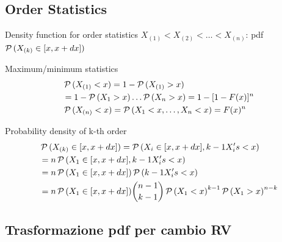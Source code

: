 \documentclass[asd-beamer.tex]{subfiles}%
\begin{document}
\subsection{Order Statistics}

\begin{frame}{Density function for order statistics}
	$X_{(1)}<X_{(2)}<\ldots<X_{(n)}$: pdf $\operatorname{\mathcal{P}}{(X_{(k)}\in[x,x+dx])}$
	\begin{block}{Maximum/minimum statistics}
		\begin{align*}
		&\operatorname{\mathcal{P}}{(X_{(1)}<x)}=1-\operatorname{\mathcal{P}}{(X_{(1)}>x)}\\
		&=1-\operatorname{\mathcal{P}}{(X_1>x)}\ldots\operatorname{\mathcal{P}}{(X_n>x)}=1-[1-F(x)]^n\\
		&\operatorname{\mathcal{P}}{(X_{(n)}<x)}=\operatorname{\mathcal{P}}{(X_1<x,\ldots,X_n<x)}=F(x)^n
		\end{align*}
	\end{block}
	\begin{block}{Probability density of k-th order}
		\begin{align*}
		&\operatorname{\mathcal{P}}{(X_{(k)}\in[x,x+dx])}=\operatorname{\mathcal{P}}{(X_i\in[x,x+dx],k-1 X_i's<x)}\\
		&=n\operatorname{\mathcal{P}}{(X_1\in[x,x+dx],k-1 X_i's<x)}\\
		&=n\operatorname{\mathcal{P}}{(X_1\in[x,x+dx])}\operatorname{\mathcal{P}}{(k-1 X_i's<x)}\\
		&=n\operatorname{\mathcal{P}}{(X_1\in[x,x+dx])}\binom{n-1}{k-1}\operatorname{\mathcal{P}}{(X_1<x)}^{k-1}\operatorname{\mathcal{P}}{(X_1>x)}^{n-k}
		\end{align*}
	\end{block}
\end{frame}

\subsection{Trasformazione pdf per cambio RV}
\end{document}
